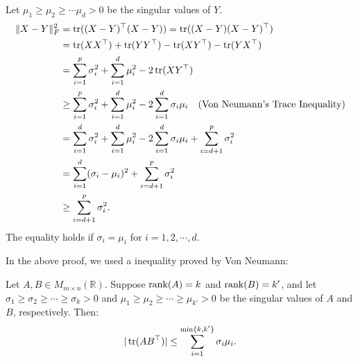 \documentclass[12pt]{article}
\begin{document}
\begin{pfbox}
Let $\mu_1\ge\mu_2\ge\cdots\mu_d>0$ be the singular values of $Y$.
\begin{align*}
    \|X-Y\|^2_F &= \operatorname{tr}((X-Y)^\top(X-Y)) = \operatorname{tr}((X-Y)(X-Y)^\top)\\
                &= \operatorname{tr}(XX^\top) + \operatorname{tr}(YY^\top) -\operatorname{tr}(XY^\top)-\operatorname{tr}(YX^\top)\\
                &= \sum_{i=1}^{p}\sigma_i^2 + \sum_{i=1}^{d}\mu_i^2-2\operatorname{tr}(XY^\top)\\
                &\ge \sum_{i=1}^{p}\sigma_i^2 + \sum_{i=1}^{d}\mu_i^2-2\sum_{i=1}^{d}\sigma_i\mu_i \quad \text{(Von Neumann's Trace Inequality)}\\
                &=\sum_{i=1}^{d}\sigma_i^2 + \sum_{i=1}^{d}\mu_i^2-2\sum_{i=1}^{d}\sigma_i\mu_i + \sum_{i=d+1}^{p}\sigma_i^2\\
                &=\sum_{i=1}^{d}(\sigma_i-\mu_i)^2 + \sum_{i=d+1}^{p}\sigma_i^2\\
                &\ge \sum_{i=d+1}^{p}\sigma_i^2.
\end{align*}
The equality holds if $\sigma_i=\mu_i$ for $i=1,2,\cdots,d.$
\end{pfbox}

In the above proof, we used a inequality proved by Von Neumann:
\begin{thmbox}
Let $A,B\in M_{m\times n}(\mathbb{R})$. Suppose $\operatorname{rank}(A)=k$ and $\operatorname{rank}(B)=k'$,
and let $\sigma_1\ge\sigma_2\ge\cdots\ge\sigma_k>0$ and $\mu_1\ge\mu_2\ge\cdots\ge\mu_{k'}>0$ be the singular values of $A$ and $B$, respectively. Then:
\[|\operatorname{tr}(AB^\top)|\le\sum_{i=1}^{\min\{k,k'\}}\sigma_i\mu_i.\]
\end{thmbox}
\end{document}
